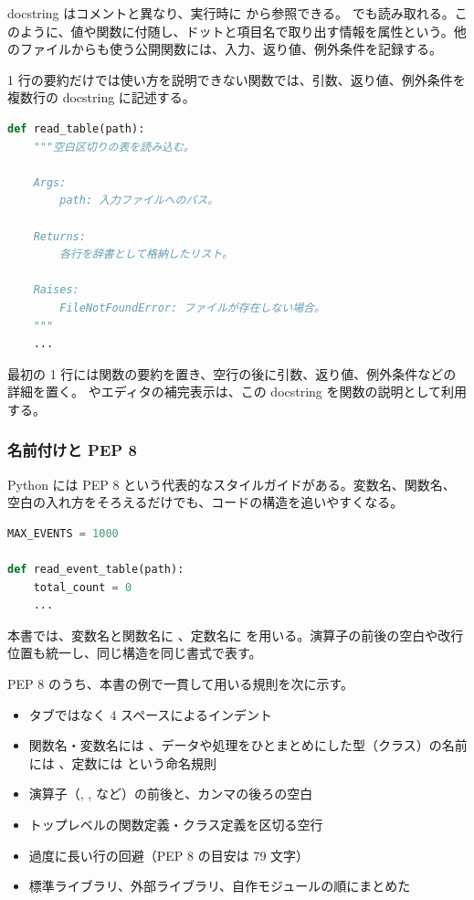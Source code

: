 docstring はコメントと異なり、実行時に  から参照できる。 でも読み取れる。このように、値や関数に付随し、ドットと項目名で取り出す情報を属性という。他のファイルからも使う公開関数には、入力、返り値、例外条件を記録する。

1 行の要約だけでは使い方を説明できない関数では、引数、返り値、例外条件を複数行の docstring に記述する。

\begin{lstlisting}[language=Python]
def read_table(path):
    """空白区切りの表を読み込む。

    Args:
        path: 入力ファイルへのパス。

    Returns:
        各行を辞書として格納したリスト。

    Raises:
        FileNotFoundError: ファイルが存在しない場合。
    """
    ...
\end{lstlisting}

最初の 1 行には関数の要約を置き、空行の後に引数、返り値、例外条件などの詳細を置く。 やエディタの補完表示は、この docstring を関数の説明として利用する。

\subsubsection{名前付けと PEP 8}

Python には PEP 8 という代表的なスタイルガイドがある。変数名、関数名、空白の入れ方をそろえるだけでも、コードの構造を追いやすくなる。

\begin{lstlisting}[language=Python]
MAX_EVENTS = 1000

def read_event_table(path):
    total_count = 0
    ...
\end{lstlisting}

本書では、変数名と関数名に 、定数名に  を用いる。演算子の前後の空白や改行位置も統一し、同じ構造を同じ書式で表す。

PEP 8 のうち、本書の例で一貫して用いる規則を次に示す。

\begin{itemize}
\item タブではなく 4 スペースによるインデント
\item 関数名・変数名には 、データや処理をひとまとめにした型（クラス）の名前には 、定数には  という命名規則
\item 演算子（\code{=}, \code{+}, \code{-} など）の前後と、カンマの後ろの空白
\item トップレベルの関数定義・クラス定義を区切る空行
\item 過度に長い行の回避（PEP 8 の目安は 79 文字）
\item 標準ライブラリ、外部ライブラリ、自作モジュールの順にまとめた 
\end{itemize}

